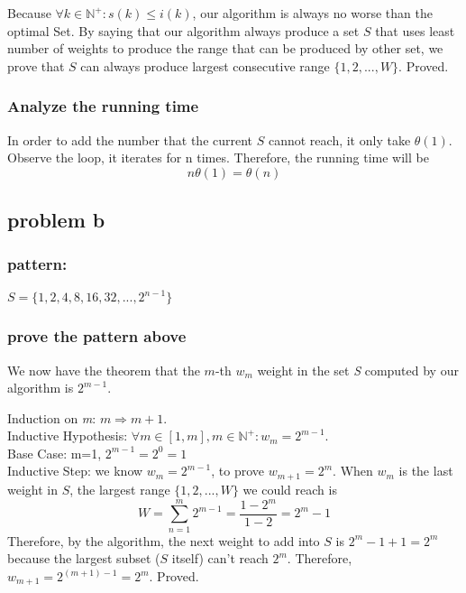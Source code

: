 \documentclass{article}
\begin{document}
            Because $\forall k\in \mathbb{N}^{+}: s(k)\leq i(k) $, our algorithm is always no worse than the optimal Set. By saying that our algorithm always produce a set $S$ that uses least number of weights to produce the range that can be produced by other set, we prove that $S$ can always produce largest consecutive range $\{1,2,...,W\}$. Proved.

        \subsubsection{Analyze the running time}
            In order to add the number that the current $S$ cannot reach, it only take $\theta(1)$. Observe the loop, it iterates for n times. Therefore, the running time will be
            \[n\theta(1)=\theta(n)\]
            
        \subsection{problem b}
        \subsubsection{pattern:}
            $S = \{1, 2, 4, 8, 16, 32, ..., 2^{n-1}\}$
        \subsubsection{prove the pattern above}
            We now have the theorem that the $m$-th $w_m$ weight in the set \textit{S} computed by our algorithm is $2^{m-1}$. 
            
            Induction on \textit{m}: $m\Rightarrow m+1$.\\
              Inductive Hypothesis: $\forall m\in [1,m], m\in \mathbb{N}^{+}: w_m = 2^{m-1}$.\\
            Base Case: m=1, $2^{m-1}=2^0=1$\\
            Inductive Step: we know $w_m=2^{m-1}$, to prove $w_{m+1}=2^{m}$. When $w_m$ is the last weight in $S$, the largest range $\{1,2,...,W\}$ we could reach is 
    \[ W = \sum_{n=1}^{m} 2^{m-1} = \frac{1-2^m}{1-2}=2^m-1 \]
            Therefore, by the algorithm, the next weight to add into $S$ is $2^m-1+1=2^m$ because the largest subset ($S$ itself) can't reach $2^m$. Therefore, $w_{m+1}=2^{(m+1)-1}=2^m$. Proved.
            
        
        
\end{document}
